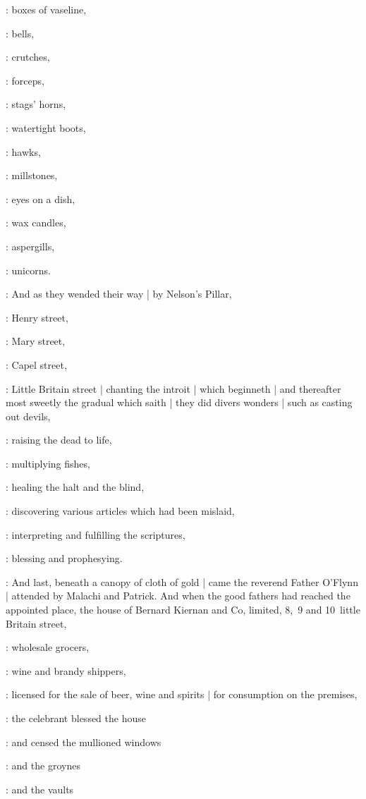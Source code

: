 :
boxes of vaseline,

:
bells,

:
crutches,

:
forceps,

:
stags' horns,

:
watertight boots,

:
hawks,

:
millstones,

:
eyes on a dish,

:
wax candles,

:
aspergills,

:
unicorns.

:
And as they wended their way |
by Nelson's Pillar,

:
Henry street,

:
Mary street,

:
Capel street,

:
Little Britain street |
chanting the introit  |
which beginneth
 |
and thereafter most sweetly the gradual 
which saith  |
they did divers wonders |
such as casting out devils,

:
raising the dead to life,

:
multiplying fishes,

:
healing the halt and the blind,

:
discovering various articles which had been mislaid,

:
interpreting and fulfilling the scriptures,

:
blessing and prophesying.

:
And last,
beneath a canopy of cloth of gold |
came the reverend Father O'Flynn |
attended by Malachi and Patrick.
And when the good fathers had reached the appointed place,
the house of Bernard Kiernan and Co,
limited,
8,~9 and 10~little Britain street,

:
wholesale grocers,

:
wine and brandy shippers,

:
licensed for the sale of beer,
wine and spirits |
for consumption on the premises,

:
the celebrant blessed the house

:
and censed the mullioned windows

:
and the groynes

:
and the vaults

